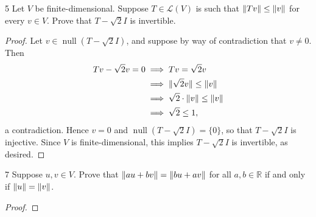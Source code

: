 \documentclass{extarticle}
\newenvironment{problem}[1]{\begin{prob*}{#1}{}}{\end{prob*}}
\newcommand{\R}{\mathbb{R}}
\newcommand{\Hom}{\mathcal{L}}
\DeclareMathOperator{\Null}{null}
\DeclarePairedDelimiter\Norm{\lVert}{\rVert}
\begin{document}
\begin{problem}{5}
Let $V$ be finite-dimensional.  Suppose $T\in\Hom(V)$ is such that $\Norm{Tv}\leq \Norm{v}$ for every $v\in V$.  Prove that $T-\sqrt{2}I$ is invertible.
\end{problem}
\begin{proof}
Let $v\in\Null(T - \sqrt{2}I)$, and suppose by way of contradiction that $v\neq 0$.  Then
\begin{align*}
Tv - \sqrt{2}v = 0 &\implies Tv = \sqrt{2}v\\
&\implies \Norm{\sqrt{2}v}\leq \Norm{v}\\
&\implies \sqrt{2}\cdot \Norm{v}\leq \Norm{v}\\
&\implies \sqrt{2} \leq 1,
\end{align*}
a contradiction.  Hence $v = 0$ and $\Null(T - \sqrt{2}I) =\{0\}$, so that $T-\sqrt{2}I$ is injective.  Since $V$ is finite-dimensional, this implies $T-\sqrt{2}I$ is invertible, as desired.
\end{proof}

\begin{problem}{7}
Suppose $u,v\in V$.  Prove that $\Norm{au + bv} = \Norm{bu + av}$ for all $a,b\in\R$ if and only if $\Norm{u} = \Norm{v}$.
\end{problem}
\begin{proof}

\end{proof}
\end{document}

